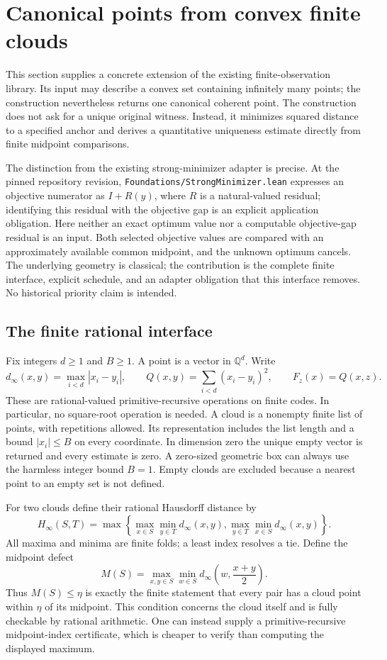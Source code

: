 \section{Canonical points from convex finite clouds}
\label{sec:convex-selector}

This section supplies a concrete extension of the existing finite-observation
library.  Its input may describe a convex set containing infinitely many points;
the construction nevertheless returns one canonical coherent point.  The
construction does not ask for a unique original witness.  Instead, it minimizes
squared distance to a specified anchor and derives a quantitative uniqueness
estimate directly from finite midpoint comparisons.

The distinction from the existing strong-minimizer adapter is precise.  At the
pinned repository revision, \texttt{Foundations/StrongMinimizer.lean} expresses
an objective numerator as \(I+R(y)\), where \(R\) is a natural-valued residual;
identifying this residual with the objective gap is an explicit application
obligation.  Here neither an exact optimum value nor a computable objective-gap
residual is an input.  Both selected objective values are compared with an
approximately available common midpoint, and the unknown optimum cancels.
The underlying geometry is classical; the contribution is the complete finite
interface, explicit schedule, and an adapter obligation that this interface
removes.  No historical priority claim is intended.

\subsection{The finite rational interface}

Fix integers \(d\geq 1\) and \(B\geq 1\).  A point is a vector in
\(\mathbb Q^d\).  Write
\[
 d_\infty(x,y)=\max_{i<d}|x_i-y_i|,
 \qquad Q(x,y)=\sum_{i<d}(x_i-y_i)^2,
 \qquad F_z(x)=Q(x,z).
\]
These are rational-valued primitive-recursive operations on finite codes.
In particular, no square-root operation is needed.  A cloud is a nonempty
finite list of points, with repetitions allowed.  Its representation includes
the list length and a bound \(|x_i|\leq B\) on every coordinate.
In dimension zero the unique empty vector is returned and every estimate is
zero.  A zero-sized geometric box can always use the harmless integer bound
\(B=1\).  Empty clouds are excluded because a nearest point to an empty set
is not defined.

For two clouds define their rational Hausdorff distance by
\[
 H_\infty(S,T)=\max\left\{
   \max_{x\in S}\min_{y\in T}d_\infty(x,y),
   \max_{y\in T}\min_{x\in S}d_\infty(x,y)\right\}.
\]
All maxima and minima are finite folds; a least index resolves a tie.  Define
the midpoint defect
\[
 M(S)=\max_{x,y\in S}\min_{w\in S}
       d_\infty\left(w,\frac{x+y}{2}\right).
\]
Thus \(M(S)\leq\eta\) is exactly the finite statement that every pair has a
cloud point within \(\eta\) of its midpoint.  This condition concerns the
cloud itself and is fully checkable by rational arithmetic.  One can instead
supply a primitive-recursive midpoint-index certificate, which is cheaper to
verify than computing the displayed maximum.


